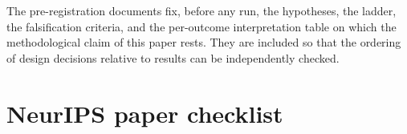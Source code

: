 The pre-registration documents fix, before any run, the hypotheses, the ladder, the
falsification criteria, and the per-outcome interpretation table on which the methodological
claim of this paper rests. They are included so that the ordering of design decisions relative
to results can be independently checked.

\clearpage
\section{NeurIPS paper checklist}
\label{app:checklist}


